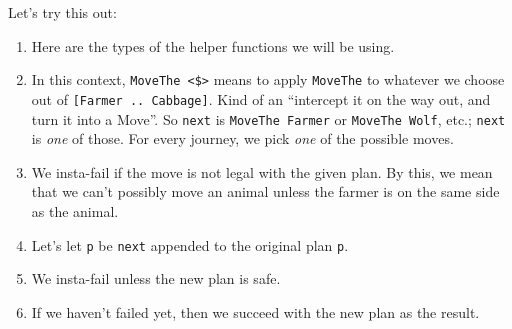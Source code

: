\documentclass[]{article}
\newenvironment{Shaded}{}{}
\newcommand{\KeywordTok}[1]{\textcolor[rgb]{0.00,0.44,0.13}{\textbf{{#1}}}}
\newcommand{\DataTypeTok}[1]{\textcolor[rgb]{0.56,0.13,0.00}{{#1}}}
\newcommand{\CommentTok}[1]{\textcolor[rgb]{0.38,0.63,0.69}{\textit{{#1}}}}
\newcommand{\OtherTok}[1]{\textcolor[rgb]{0.00,0.44,0.13}{{#1}}}
\newcommand{\FunctionTok}[1]{\textcolor[rgb]{0.02,0.16,0.49}{{#1}}}
\newcommand{\NormalTok}[1]{{#1}}
\begin{document}
Let's try this out:

\begin{Shaded}
\end{Shaded}

\begin{enumerate}
\def\labelenumi{\arabic{enumi}.}
\tightlist
\item
  Here are the types of the helper functions we will be using.
\item
  In this context, \texttt{MoveThe\ \textless{}\$\textgreater{}} means to apply
  \texttt{MoveThe} to whatever we choose out of
  \texttt{{[}Farmer\ ..\ Cabbage{]}}. Kind of an ``intercept it on the way out,
  and turn it into a Move''. So \texttt{next} is \texttt{MoveThe\ Farmer} or
  \texttt{MoveThe\ Wolf}, etc.; \texttt{next} is \emph{one} of those. For every
  journey, we pick \emph{one} of the possible moves.
\item
  We insta-fail if the move is not legal with the given plan. By this, we mean
  that we can't possibly move an animal unless the farmer is on the same side as
  the animal.
\item
  Let's let \texttt{p\textquotesingle{}} be \texttt{next} appended to the
  original plan \texttt{p}.
\item
  We insta-fail unless the new plan is safe.
\item
  If we haven't failed yet, then we succeed with the new plan as the result.
\end{enumerate}
\end{document}

